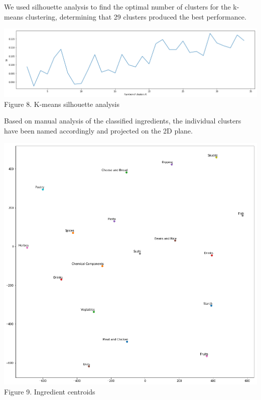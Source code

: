 \documentclass[11pt]{article}
\begin{document}
We used silhouette analysis to find the optimal number of clusters for the k-means clustering, determining that 29 clusters produced the best performance.

\vspace{5mm}
\begin{center}
\includegraphics[scale=0.18]{ingredient-kmeans}
\label{ingredient-kmeans} Figure 8. K-means silhouette analysis
\end{center}
\vspace{5mm}

Based on manual analysis of the classified ingredients, the individual clusters have been named accordingly and projected on the 2D plane.

\vspace{5mm}
\begin{center}
\includegraphics[scale=0.24]{ingredient-clusters}
\label{ingredient-clusters} Figure 9. Ingredient centroids
\end{center}
\vspace{5mm}
\end{document}
